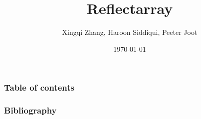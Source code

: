 \documentclass[handout]{beamer}
\begin{document}
\title{Reflectarray}  
\author{Xingqi Zhang, Haroon Siddiqui, Peeter Joot}

\date{\today} 

\begin{frame}
\titlepage
\end{frame} 

\begin{frame}
\frametitle{Table of contents}
\tableofcontents
\end{frame} 



\begin{frame}[allowframebreaks]
\frametitle{Bibliography}


\end{frame}
\end{document}
